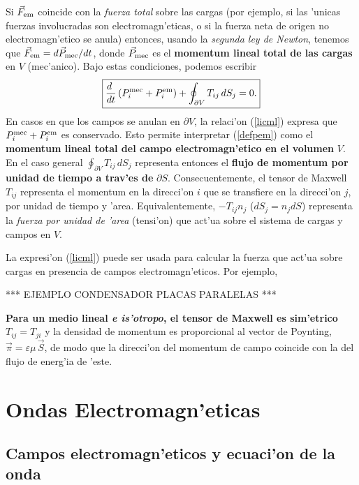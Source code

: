 Si $\vec{F}_{\rm em}$ coincide con la \textit{fuerza total} sobre las cargas (por ejemplo, si las 'unicas fuerzas involucradas son electromagn'eticas, o si la fuerza neta de origen no electromagn'etico se anula) entonces, usando la \textit{segunda ley de Newton}, tenemos que $\vec{F}_{\rm em}=d\vec{P}_{\rm mec}/dt$, donde $\vec{P}_{\rm mec}$ es el \textbf{momentum lineal total de las cargas} en $V$ (mec'anico). Bajo estas condiciones, podemos escribir
\begin{equation}
\boxed{\frac{d\ }{dt}\left(P_i^{\rm mec}+P_i^{\rm em}\right)+\oint_{\partial
V}T_{ij}\,dS_j =0.} \label{licml}
\end{equation}
En casos en que los campos se anulan en $\partial V$, la relaci'on
(\ref{licml}) expresa que $P_i^{\rm mec}+P_i^{\rm em}$ es conservado. Esto
permite interpretar (\ref{defpem}) como el \textbf{momentum lineal total del
campo electromagn'etico en el volumen} $V$. En el caso general $\oint_{\partial
V}T_{ij}\,dS_j $ representa entonces el \textbf{flujo de momentum por unidad de tiempo
a trav'es de} $\partial S$. Consecuentemente, el tensor de Maxwell $T_{ij}$
representa el momentum en la direcci'on $i$ que se transfiere en la direcci'on
$j$, por unidad de tiempo y 'area. Equivalentemente, $-T_{ij}n_j$ ($dS_j=n_jdS$)
representa la \textit{fuerza por unidad de 'area} (tensi'on) que act'ua sobre el sistema
de cargas y campos en $V$.

La expresi'on (\ref{licml}) puede ser usada para calcular la fuerza que act'ua
sobre cargas en presencia de campos electromagn'eticos. Por ejemplo,

\begin{center}
*** EJEMPLO CONDENSADOR PLACAS PARALELAS ***
\end{center}

\textbf{Para un medio lineal \textit{e is'otropo}, el tensor de Maxwell es sim'etrico
$T_{ij}=T_{ji}$} y la densidad de momentum es proporcional al vector de
Poynting, $\vec{\pi}=\varepsilon\mu\,\vec{S}$, de modo que la direcci'on del
momentum de campo coincide con la del flujo de energ'ia de
'este.

\section{Ondas Electromagn'eticas}

\subsection{Campos electromagn'eticos y ecuaci'on de la onda}

